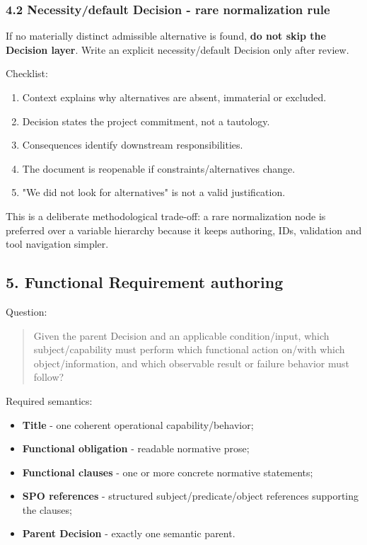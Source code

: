 \documentclass[
  10pt,
]{article}
\providecommand{\tightlist}{%
  \setlength{\itemsep}{0pt}\setlength{\parskip}{0pt}}
\begin{document}
\subsubsection{4.2 Necessity/default Decision - rare normalization
rule}\label{42-necessitydefault-decision---rare-normalization-rule}

If no materially distinct admissible alternative is found, \textbf{do
not skip the Decision layer}. Write an explicit necessity/default
Decision only after review.

Checklist:

\begin{enumerate}
\def\labelenumi{\arabic{enumi}.}
\tightlist
\item
  Context explains why alternatives are absent, immaterial or excluded.
\item
  Decision states the project commitment, not a tautology.
\item
  Consequences identify downstream responsibilities.
\item
  The document is reopenable if constraints/alternatives change.
\item
  "We did not look for alternatives" is not a valid justification.
\end{enumerate}

This is a deliberate methodological trade-off: a rare normalization node
is preferred over a variable hierarchy because it keeps authoring, IDs,
validation and tool navigation simpler.

\subsection{5. Functional Requirement
authoring}\label{5-functional-requirement-authoring}

Question:

\begin{quote}
Given the parent Decision and an applicable condition/input, which
subject/capability must perform which functional action on/with which
object/information, and which observable result or failure behavior must
follow?
\end{quote}

Required semantics:

\begin{itemize}
\tightlist
\item
  \textbf{Title} - one coherent operational capability/behavior;
\item
  \textbf{Functional obligation} - readable normative prose;
\item
  \textbf{Functional clauses} - one or more concrete normative
  statements;
\item
  \textbf{SPO references} - structured subject/predicate/object
  references supporting the clauses;
\item
  \textbf{Parent Decision} - exactly one semantic parent.
\end{itemize}
\end{document}
